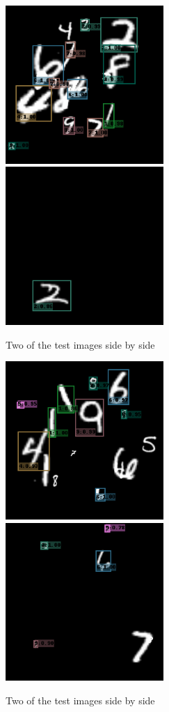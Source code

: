 \documentclass{article}
\begin{document}
\begin{figure}[H]%
    \centering
    {{\includegraphics[width=6cm]{Assignments/Assignment_4/plots/4.png} }}%
    \qquad
    {{\includegraphics[width=6cm]{Assignments/Assignment_4/plots/5.png} }}%
    \caption{Two of the test images side by side}%
    \label{fig:test2}%
\end{figure}

\begin{figure}[H]%
    \centering
    {{\includegraphics[width=6cm]{Assignments/Assignment_4/plots/6.png} }}%
    \qquad
   {{\includegraphics[width=6cm]{Assignments/Assignment_4/plots/7.png} }}%
    \caption{Two of the test images side by side}%
    \label{fig:test3}%
\end{figure}
\end{document}
